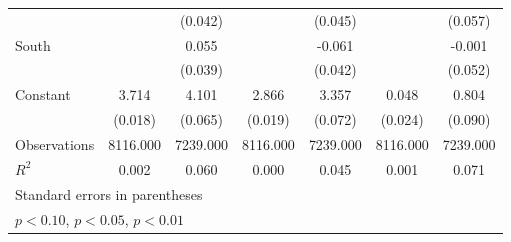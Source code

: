 {\begin{tabular}{l*{6}{c}}
                    &                     &     (0.042)         &                     &     (0.045)         &                     &     (0.057)         \\
\addlinespace
South               &                     &       0.055         &                     &      -0.061         &                     &      -0.001         \\
                    &                     &     (0.039)         &                     &     (0.042)         &                     &     (0.052)         \\
\addlinespace
Constant            &       3.714\sym{***}&       4.101\sym{***}&       2.866\sym{***}&       3.357\sym{***}&       0.048\sym{**} &       0.804\sym{***}\\
                    &     (0.018)         &     (0.065)         &     (0.019)         &     (0.072)         &     (0.024)         &     (0.090)         \\
\midrule
Observations        &    8116.000         &    7239.000         &    8116.000         &    7239.000         &    8116.000         &    7239.000         \\
\(R^{2}\)           &       0.002         &       0.060         &       0.000         &       0.045         &       0.001         &       0.071         \\
\bottomrule
\multicolumn{7}{l}{\footnotesize Standard errors in parentheses}\\
\multicolumn{7}{l}{\footnotesize \sym{*} \(p<0.10\), \sym{**} \(p<0.05\), \sym{***} \(p<0.01\)}\\
\end{tabular}
}
